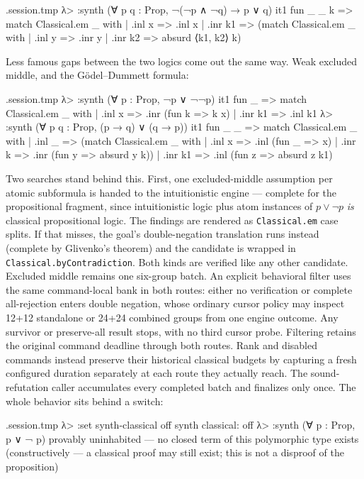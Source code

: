 \documentclass[11pt,oneside]{article}
\newcommand{\code}[1]{\texttt{#1}}
\newenvironment{session}
 {\VerbatimEnvironment\begin{VerbatimOut}{\jobname.session.tmp}}
 {\end{VerbatimOut}%
  \begin{sessionouter}%
  \VerbatimInput[fontsize=\footnotesize, breaklines=true,
    breaksymbolleft={\textcolor{stone}{\footnotesize$\hookrightarrow$}},
    formatcom=\color{ink}, tabsize=4]{\jobname.session.tmp}%
  \end{sessionouter}}
\begin{document}
\begin{session}
λ> :synth (∀ p q : Prop, ¬(¬p ∧ ¬q) → p ∨ q)
  it1  fun _ _ k => match Classical.em _ with | .inl x => .inl x | .inr k1 => (match Classical.em _ with | .inl y => .inr y | .inr k2 => absurd ⟨k1, k2⟩ k)
\end{session}

Less famous gaps between the two logics come out the same way. Weak
excluded middle, and the G\"odel--Dummett formula:

\begin{session}
λ> :synth (∀ p : Prop, ¬p ∨ ¬¬p)
  it1  fun _ => match Classical.em _ with | .inl x => .inr (fun k => k x) | .inr k1 => .inl k1
λ> :synth (∀ p q : Prop, (p → q) ∨ (q → p))
  it1  fun _ _ => match Classical.em _ with | .inl _ => (match Classical.em _ with | .inl x => .inl (fun _ => x) | .inr k => .inr (fun y => absurd y k)) | .inr k1 => .inl (fun z => absurd z k1)
\end{session}

Two searches stand behind this. First, one excluded-middle assumption
per atomic subformula is handed to the intuitionistic engine ---
complete for the propositional fragment, since intuitionistic logic
plus atom instances of $p \vee \neg p$ \emph{is} classical
propositional logic. The findings are rendered as \code{Classical.em}
case splits. If that misses, the goal's double-negation translation runs
instead (complete by Glivenko's theorem) and the candidate is wrapped
in \code{Classical.byContradiction}. Both kinds are verified like any
other candidate. Excluded middle remains one six-group batch. An explicit
behavioral filter uses the same command-local bank in both routes: either no
verification or complete all-rejection enters double negation, whose ordinary
cursor policy may inspect 12+12 standalone or 24+24 combined groups from one
engine outcome. Any survivor or preserve-all result stops, with no third
cursor probe. Filtering retains the original command deadline through both
routes. Rank and disabled commands instead preserve their historical classical
budgets by capturing a fresh configured duration separately at each route they
actually reach. The sound-refutation caller accumulates every completed batch
and finalizes only once. The whole behavior sits behind a switch:

\begin{session}
λ> :set synth-classical off
synth classical: off
λ> :synth (∀ p : Prop, p ∨ ¬ p)
provably uninhabited — no closed term of this polymorphic type exists
(constructively — a classical proof may still exist; this is not a disproof of the proposition)
\end{session}
\end{document}
